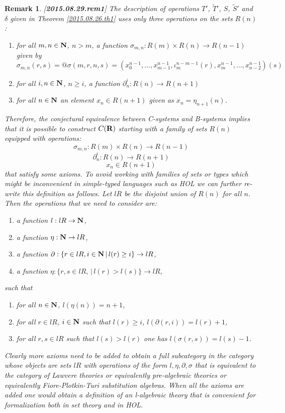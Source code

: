 \documentclass[11pt]{article}
\newtheorem{remark}[proposition]{Remark}
\newcommand{\llabel}[1]{\label{#1}[{\bf #1}]}
\newcommand{\sr}{\rightarrow}
\newcommand{\nn}{{\bf N\rm}}
\newcommand{\nat}{\nn}
\newcommand{\rr}{{\bf R}}
\newcommand{\wt}{\widetilde}
\begin{document}
\begin{remark}\rm
\llabel{2015.08.29.rem1}
The description of operations $T'$, $\wt{T}'$, $S$, $\wt{S}'$ and $\delta$ given in Theorem \ref{2015.08.26.th1} uses only three operations on the sets $R(n)$:
%
\begin{enumerate}
\item for all $m,n\in\nat$, $n>m$, a function $\sigma_{m,n}:R(m)\times R(n)\sr R(n-1)$ given by 
%
$$\sigma_{m,n}(r,s)=@\sigma(m,r,n,s)=(x_0^{n-1},\dots,x_{m-1}^{n-1},\iota_m^{n-m-1}(r),x_{m}^{n-1},\dots,x_{n-2}^{n-1})(s)$$
%
\item for all $i,n\in\nat$, $n\ge i$, a function $\partial_n^i:R(n)\sr R(n+1)$ 
%
\item for all $n\in\nat$ an element $x_{n}\in R(n+1)$ given as $x_{n}=\eta_{n+1}(n)$.
\end{enumerate}
%
Therefore, the conjectural equivalence between C-systems and B-systems implies that it is possible to construct $C(\rr)$ starting with a family of sets $R(n)$ equipped with operations:
%
$$\sigma_{m,n}:R(m)\times R(n)\sr R(n-1)$$
$$\partial_n^i:R(n)\sr R(n+1)$$
$$x_{n}\in R(n+1)$$
%
that satisfy some axioms. To avoid working with families of sets or types which might be inconvenient in simple-typed languages such as HOL we can further re-write this definition as follows. Let $lR$ be the disjoint union of $R(n)$ for all $n$. Then the operations that we need to consider are:
%
\begin{enumerate}
\item a function $l:lR\sr\nat$,
\item a function $\eta:\nat\sr lR$,
\item a function $\partial:\{r\in lR, i\in\nat\,|\, l(r)\ge i\}\sr lR$,
\item a function $\eta:\{r,s\in lR,\,|\,l(r)>l(s)\}\sr lR$,
\end{enumerate}
%
such that
%
\begin{enumerate}
\item for all $n\in\nat$, $l(\eta(n))=n+1$,
\item for all $r\in lR$, $i\in\nat $ such that $l(r)\ge i$, $l(\partial(r,i))=l(r)+1$,
\item for all $r,s\in lR$ such that $l(s)>l(r)$ one has $l(\sigma(r,s))=l(s)-1$.
\end{enumerate}
%
Clearly more axioms need to be added to obtain a full subcategory in the category whose objects are sets $lR$ with operations of the form $l,\eta,\partial,\sigma$ that is equivalent to the category of Lawvere theories or equivalently pre-algebraic theories or equivalently Fiore-Plotkin-Turi substitution algebras. When all the axioms are added one would obtain a definition of an l-algebraic theory that is convenient for formalization both in set theory and in HOL. 
\end{remark}
\end{document}

